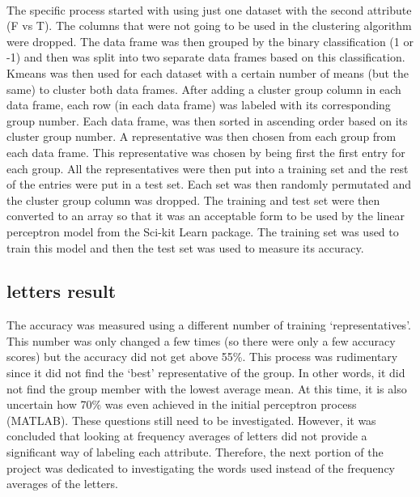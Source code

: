 \documentclass{article}
\begin{document}
\\
The specific process started with using just one dataset with the second attribute (F vs T). The columns that were not going to be used in the clustering algorithm were dropped. The data frame was then grouped by the binary classification (1 or -1) and then was split into two separate data frames based on this classification. 
\\
Kmeans was then used for each dataset with a certain number of means (but the same) to cluster both data frames. After adding a cluster group column in each data frame, each row (in each data frame) was labeled with its corresponding group number. Each data frame, was then sorted in ascending order based on its cluster group number. A representative was then chosen from each group from each data frame. This representative was chosen by being first the first entry for each group. All the representatives were then put into a training set and the rest of the entries were put in a test set. Each set was then randomly permutated and the cluster group column was dropped. The training and test set were then converted to an array so that it was an acceptable form to be used by the linear perceptron model from the Sci-kit Learn package. The training set was used to train this model and then the test set was used to measure its accuracy.

\subsection{letters result}
The accuracy was measured using a different number of training ‘representatives’. This number was only changed a few times (so there were only a few accuracy scores) but the accuracy did not get above 55\%. This process was rudimentary since it did not find the ‘best’ representative of the group. In other words, it did not find the group member with the lowest average mean. At this time, it is also uncertain how 70\% was even achieved in the initial perceptron process (MATLAB). These questions still need to be investigated. However, it was concluded that looking at frequency averages of letters did not provide a significant way of labeling each attribute. Therefore, the next portion of the project was dedicated to investigating the words used instead of the frequency averages of the letters.
\end{document}
